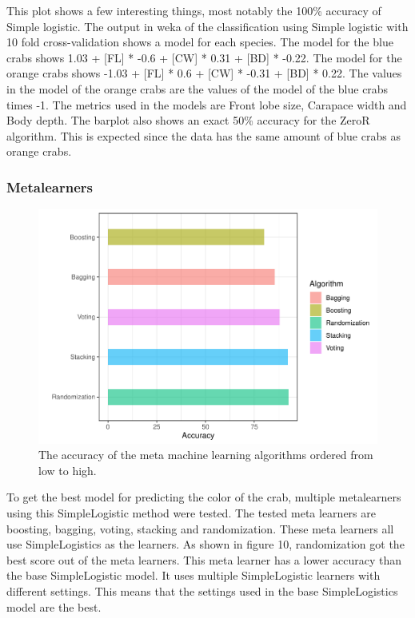 \documentclass[
]{article}
\begin{document}
This plot shows a few interesting things, most notably the 100\%
accuracy of Simple logistic. The output in weka of the classification
using Simple logistic with 10 fold cross-validation shows a model for
each species. The model for the blue crabs shows 1.03 + {[}FL{]} * -0.6
+ {[}CW{]} * 0.31 + {[}BD{]} * -0.22. The model for the orange crabs
shows -1.03 + {[}FL{]} * 0.6 + {[}CW{]} * -0.31 + {[}BD{]} * 0.22. The
values in the model of the orange crabs are the values of the model of
the blue crabs times -1. The metrics used in the models are Front lobe
size, Carapace width and Body depth. The barplot also shows an exact
50\% accuracy for the ZeroR algorithm. This is expected since the data
has the same amount of blue crabs as orange crabs.

\newpage

\hypertarget{metalearners}{%
\subsubsection{Metalearners}\label{metalearners}}

\begin{figure}[H]

{\centering \includegraphics{CrabProject_files/figure-latex/metalearners-1} 

}

\caption{The accuracy of the meta machine learning algorithms ordered from low to high.}\label{fig:metalearners}
\end{figure}

To get the best model for predicting the color of the crab, multiple
metalearners using this SimpleLogistic method were tested. The tested
meta learners are boosting, bagging, voting, stacking and randomization.
These meta learners all use SimpleLogistics as the learners. As shown in
figure 10, randomization got the best score out of the meta learners.
This meta learner has a lower accuracy than the base SimpleLogistic
model. It uses multiple SimpleLogistic learners with different settings.
This means that the settings used in the base SimpleLogistics model are
the best.
\end{document}
